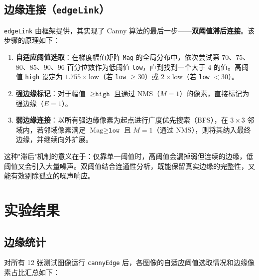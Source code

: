 \documentclass[12pt,a4paper]{ctexart}
\begin{document}
\subsection{边缘连接（\texttt{edgeLink}）}

\texttt{edgeLink} 由框架提供，其实现了 Canny 算法的最后一步——\textbf{双阈值滞后连接}。该步骤的原理如下：

\begin{enumerate}
  \item \textbf{自适应阈值选取}：在梯度幅值矩阵 \texttt{Mag} 的全局分布中，依次尝试第 70、75、80、85、90、96 百分位数作为低阈值 \texttt{low}，直到找到一个大于 4 的值。高阈值 \texttt{high} 设定为 $1.755 \times \text{low}$（若 \texttt{low} $\geq 30$）或 $2 \times \text{low}$（若 \texttt{low} $< 30$）。
  \item \textbf{强边缘标记}：对于幅值 $\geq \texttt{high}$ 且通过 NMS（$M = 1$）的像素，直接标记为强边缘（$E = 1$）。
  \item \textbf{弱边缘连接}：以所有强边缘像素为起点进行广度优先搜索（BFS），在 $3 \times 3$ 邻域内，若邻域像素满足 $\text{Mag} \geq \texttt{low}$ 且 $M = 1$（通过 NMS），则将其纳入最终边缘，并继续向外扩展。
\end{enumerate}

这种"滞后"机制的意义在于：仅靠单一阈值时，高阈值会漏掉弱但连续的边缘，低阈值又会引入大量噪声。双阈值结合连通性分析，既能保留真实边缘的完整性，又能有效剔除孤立的噪声响应。

\section{实验结果}

\subsection{边缘统计}

对所有 12 张测试图像运行 \texttt{cannyEdge} 后，各图像的自适应阈值选取情况和边缘像素占比汇总如下：
\end{document}
